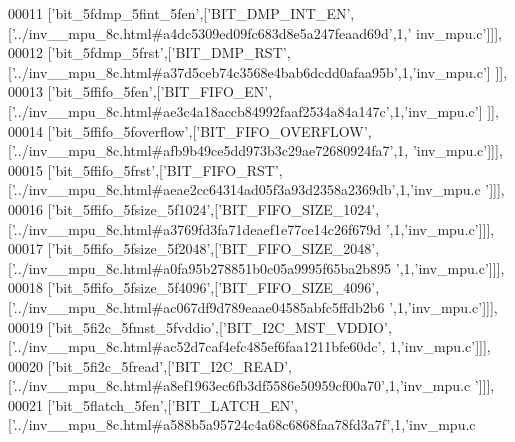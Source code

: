 \begin{DoxyCode}
00011   [\textcolor{stringliteral}{'bit\_5fdmp\_5fint\_5fen'},[\textcolor{stringliteral}{'BIT\_DMP\_INT\_EN'},[\textcolor{stringliteral}{'../inv\_\_mpu\_8c.html#a4dc5309ed09fc683d8e5a247feaad69d'},1,\textcolor{stringliteral}{'
      inv\_mpu.c'}]]],
00012   [\textcolor{stringliteral}{'bit\_5fdmp\_5frst'},[\textcolor{stringliteral}{'BIT\_DMP\_RST'},[\textcolor{stringliteral}{'../inv\_\_mpu\_8c.html#a37d5ceb74c3568e4bab6dcdd0afaa95b'},1,\textcolor{stringliteral}{'inv\_mpu.c'}]
      ]],
00013   [\textcolor{stringliteral}{'bit\_5ffifo\_5fen'},[\textcolor{stringliteral}{'BIT\_FIFO\_EN'},[\textcolor{stringliteral}{'../inv\_\_mpu\_8c.html#ae3c4a18accb84992faaf2534a84a147c'},1,\textcolor{stringliteral}{'inv\_mpu.c'}]
      ]],
00014   [\textcolor{stringliteral}{'bit\_5ffifo\_5foverflow'},[\textcolor{stringliteral}{'BIT\_FIFO\_OVERFLOW'},[\textcolor{stringliteral}{'../inv\_\_mpu\_8c.html#afb9b49ce5dd973b3c29ae72680924fa7'},1,\textcolor{stringliteral}{
      'inv\_mpu.c'}]]],
00015   [\textcolor{stringliteral}{'bit\_5ffifo\_5frst'},[\textcolor{stringliteral}{'BIT\_FIFO\_RST'},[\textcolor{stringliteral}{'../inv\_\_mpu\_8c.html#aeae2cc64314ad05f3a93d2358a2369db'},1,\textcolor{stringliteral}{'inv\_mpu.c
      '}]]],
00016   [\textcolor{stringliteral}{'bit\_5ffifo\_5fsize\_5f1024'},[\textcolor{stringliteral}{'BIT\_FIFO\_SIZE\_1024'},[\textcolor{stringliteral}{'../inv\_\_mpu\_8c.html#a3769fd3fa71deaef1e77ce14c26f679d
      '},1,\textcolor{stringliteral}{'inv\_mpu.c'}]]],
00017   [\textcolor{stringliteral}{'bit\_5ffifo\_5fsize\_5f2048'},[\textcolor{stringliteral}{'BIT\_FIFO\_SIZE\_2048'},[\textcolor{stringliteral}{'../inv\_\_mpu\_8c.html#a0fa95b278851b0c05a9995f65ba2b895
      '},1,\textcolor{stringliteral}{'inv\_mpu.c'}]]],
00018   [\textcolor{stringliteral}{'bit\_5ffifo\_5fsize\_5f4096'},[\textcolor{stringliteral}{'BIT\_FIFO\_SIZE\_4096'},[\textcolor{stringliteral}{'../inv\_\_mpu\_8c.html#ac067df9d789eaae04585abfc5ffdb2b6
      '},1,\textcolor{stringliteral}{'inv\_mpu.c'}]]],
00019   [\textcolor{stringliteral}{'bit\_5fi2c\_5fmst\_5fvddio'},[\textcolor{stringliteral}{'BIT\_I2C\_MST\_VDDIO'},[\textcolor{stringliteral}{'../inv\_\_mpu\_8c.html#ac52d7caf4efc485ef6faa1211bfe60dc'},
      1,\textcolor{stringliteral}{'inv\_mpu.c'}]]],
00020   [\textcolor{stringliteral}{'bit\_5fi2c\_5fread'},[\textcolor{stringliteral}{'BIT\_I2C\_READ'},[\textcolor{stringliteral}{'../inv\_\_mpu\_8c.html#a8ef1963ec6fb3df5586e50959cf00a70'},1,\textcolor{stringliteral}{'inv\_mpu.c
      '}]]],
00021   [\textcolor{stringliteral}{'bit\_5flatch\_5fen'},[\textcolor{stringliteral}{'BIT\_LATCH\_EN'},[\textcolor{stringliteral}{'../inv\_\_mpu\_8c.html#a588b5a95724c4a68c6868faa78fd3a7f'},1,\textcolor{stringliteral}{'inv\_mpu.c
}
\end{DoxyCode}
